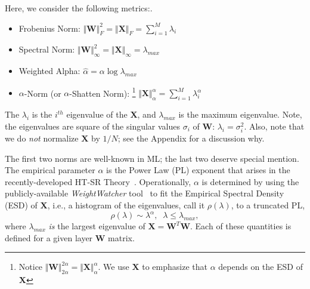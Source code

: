Here, we consider the following metrics:.

\begin{itemize}
\item 
Frobenius Norm: $\Vert\mathbf{W}\Vert^{2}_{F}=\Vert\mathbf{X}\Vert_{F}=\sum_{i=1}^{M} \lambda_{i}$
\item 
Spectral Norm: $\Vert\mathbf{W}\Vert_{\infty}^{2}=\Vert\mathbf{X}\Vert_{\infty}=\lambda_{max}$
\item 
Weighted Alpha: $\hat{\alpha}=\alpha\log\lambda_{max}$
\item 
$\alpha$-Norm (or $\alpha$-Shatten Norm):
\footnote{Notice  $\Vert\mathbf{W}\Vert^{2\alpha}_{2\alpha}=\Vert\mathbf{X}\Vert^{\alpha}_{\alpha}$. We use $\mathbf{X}$ to emphasize that $\alpha$ depends on the ESD of $\mathbf{X}$}
 $\Vert\mathbf{X}\Vert^{\alpha}_{\alpha}=\sum_{i=1}^{M}\lambda_{i}^{\alpha}$
\end{itemize}

The  $\lambda_{i}$ is the $i^{th}$ eigenvalue of the $\mathbf{X}$, 
and $\lambda_{max}$ is the maximum eigenvalue.
Note, the eigenvalues are square of the singular values $\sigma_{i}$ of $\mathbf{W}$: $\lambda_{i}=\sigma^{2}_{i}$.
Also, note that we do \emph{not} normalize $\mathbf{X}$ by $1/N$; see the Appendix for a discussion why.

The first two norms are well-known in ML; the last two deserve special mention.
The empirical parameter $\alpha$ is the Power Law (PL) exponent that arises in the recently-developed HT-SR Theory~\cite{MM18_TR, MM19_HTSR_ICML, MM20_SDM}.
Operationally, $\alpha$ is determined by using the publicly-available \emph{WeightWatcher} tool~\cite{weightwatcher_package} to fit the Empirical Spectral Density (ESD) of $\mathbf{X}$, i.e., a histogram of the eigenvalues, call it $\rho(\lambda)$, to a truncated PL, 
\begin{equation}
\rho(\lambda)\sim\lambda^{\alpha},\;\;\lambda\le\lambda_{max}  ,
\end{equation}
where $\lambda_{max}$ \emph{is} the largest eigenvalue of $\mathbf{X}=\mathbf{W}^{T}\mathbf{W}$.
Each of these quantities is defined for a given layer $\mathbf{W}$ matrix.

